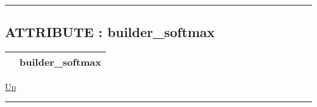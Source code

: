 \par


\rule{\textwidth}{0.4pt}
\subsection*{ATTRIBUTE : builder\_softmax}
\hypertarget{ecldoc:logisticregression.constants.builder_softmax}{}

{\renewcommand{\arraystretch}{1.5}
\begin{tabularx}{\textwidth}{|>{\raggedright\arraybackslash}l|X|}
\hline
\hspace{0pt} & builder\_softmax \\
\hline
\end{tabularx}
}

\hyperlink{ecldoc:LogisticRegression.Constants}{Up}

\par


\rule{\textwidth}{0.4pt}


